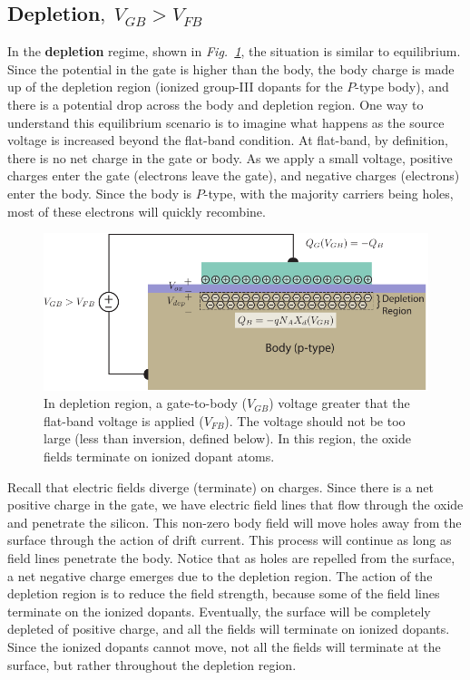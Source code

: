 \subsection{Depletion\texorpdfstring{$,\;V_{GB}>V_{FB}$}{}}
In the \textbf{depletion} regime, shown in \emph{Fig.~\ref{fig:mos_dep}}, the situation is similar to equilibrium.  Since the potential in the gate is higher than the body, the body charge is made up of the depletion region (ionized group-III dopants for the $P$-type body), and there is a potential drop across the body and depletion region.  One way to understand this equilibrium scenario is to imagine what happens as the source voltage is increased beyond the flat-band condition.  At flat-band, by definition, there is no net charge in the gate or body.  As we apply a small voltage, positive charges enter the gate (electrons leave the gate), and negative charges (electrons) enter the body. Since the body is $P$-type, with the majority carriers being holes, most of these electrons will quickly recombine.  
\begin{figure}[H]
\centering
\includegraphics[width=.95\columnwidth]{mos_cap_depletion}
\caption{In depletion region, a gate-to-body ($V_{GB}$) voltage greater that the flat-band voltage is applied ($V_{FB}$).  The voltage should not be too large (less than inversion, defined below).  In this region, the oxide fields terminate on ionized dopant atoms.}
\label{fig:mos_dep}
\end{figure}
\newpage
Recall that electric fields diverge (terminate) on charges.  Since there is a net positive charge in the gate, we have electric field lines that flow through the oxide and penetrate the silicon.  This non-zero body field will move holes away from the surface through the action of drift current.  This process will continue as long as field lines penetrate the body.  Notice that as holes are repelled from the surface, a net negative charge emerges due to the depletion region.  The action of the depletion region is to reduce the field strength, because some of the field lines terminate on the ionized dopants.  Eventually, the surface will be completely depleted of positive charge, and all the fields will terminate on ionized dopants.  Since the ionized dopants cannot move, not all the fields will terminate at the surface, but rather throughout the depletion region.
